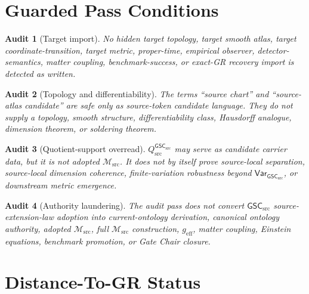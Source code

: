 \documentclass[11pt]{article}
\newcommand{\Msrc}{\mathcal{M}_{\mathrm{src}}}
\newcommand{\geff}{g_{\mathrm{eff}}}
\newcommand{\GSC}{\mathsf{GSC}_{\mathrm{src}}}
\newcommand{\Vargsc}{\mathsf{Var}_{\GSC}}
\newcommand{\Qsrc}{Q_{\mathrm{src}}^{\GSC}}
\newtheorem{audit}{Audit}
\begin{document}
\section{Guarded Pass Conditions}

\begin{audit}[Target import]
No hidden target topology, target smooth atlas, target coordinate-transition,
target metric, proper-time, empirical observer, detector-semantics, matter
coupling, benchmark-success, or exact-GR recovery import is detected as
written.
\end{audit}

\begin{audit}[Topology and differentiability]
The terms ``source chart'' and ``source-atlas candidate'' are safe only as
source-token candidate language. They do not supply a topology, smooth
structure, differentiability class, Hausdorff analogue, dimension theorem, or
soldering theorem.
\end{audit}

\begin{audit}[Quotient-support overread]
\(\Qsrc\) may serve as candidate carrier data, but it is not adopted
\(\Msrc\). It does not by itself prove source-local separation, source-local
dimension coherence, finite-variation robustness beyond \(\Vargsc\), or
downstream metric emergence.
\end{audit}

\begin{audit}[Authority laundering]
The audit pass does not convert \(\GSC\) source-extension-law adoption into
current-ontology derivation, canonical ontology authority, adopted \(\Msrc\),
full \(\Msrc\) construction, \(\geff\), matter coupling, Einstein equations,
benchmark promotion, or Gate Chair closure.
\end{audit}

\section{Distance-To-GR Status}
\end{document}
